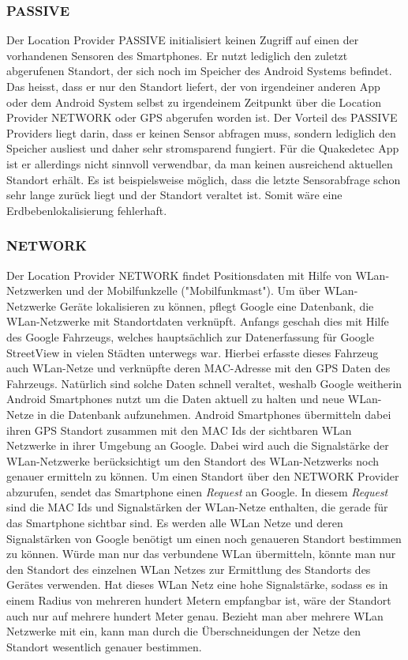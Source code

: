 \subsubsection{PASSIVE}
Der Location Provider PASSIVE initialisiert keinen Zugriff auf einen der vorhandenen Sensoren des Smartphones. Er nutzt lediglich den zuletzt abgerufenen Standort, der sich noch im Speicher des Android Systems befindet. Das heisst, dass er nur den Standort liefert, der von irgendeiner anderen App oder dem Android System selbst zu irgendeinem Zeitpunkt über die Location Provider NETWORK oder GPS abgerufen worden ist. Der Vorteil des PASSIVE Providers liegt darin, dass er keinen Sensor abfragen muss, sondern lediglich den Speicher ausliest und daher sehr stromsparend fungiert. Für die Quakedetec App ist er allerdings nicht sinnvoll verwendbar, da man keinen ausreichend aktuellen Standort erhält. Es ist beispielsweise möglich, dass die letzte Sensorabfrage schon sehr lange zurück liegt und der Standort veraltet ist.
Somit wäre eine Erdbebenlokalisierung fehlerhaft.

\subsubsection{NETWORK}
Der Location Provider NETWORK findet Positionsdaten mit Hilfe von WLan-Netzwerken und der Mobilfunkzelle ("Mobilfunkmast"). 
Um über WLan-Netzwerke Geräte lokalisieren zu können, pflegt Google eine Datenbank, die WLan-Netzwerke mit Standortdaten verknüpft.
Anfangs geschah dies mit Hilfe des Google Fahrzeugs, welches hauptsächlich zur Datenerfassung für Google StreetView in vielen Städten unterwegs war. Hierbei erfasste dieses Fahrzeug auch WLan-Netze und verknüpfte deren MAC-Adresse mit den GPS Daten des Fahrzeugs.
Natürlich sind solche Daten schnell veraltet, weshalb Google weitherin Android Smartphones nutzt um die Daten aktuell zu halten und neue WLan-Netze in die Datenbank aufzunehmen.
Android Smartphones übermitteln dabei ihren GPS Standort zusammen mit den MAC Ids der sichtbaren WLan Netzwerke in ihrer Umgebung an Google. Dabei wird auch die Signalstärke der WLan-Netzwerke berücksichtigt um den Standort des WLan-Netzwerks noch genauer ermitteln zu können.
Um einen Standort über den NETWORK Provider abzurufen, sendet das Smartphone einen \textit{Request} an Google. In diesem \textit{Request} sind die MAC Ids  und Signalstärken der WLan-Netze enthalten, die gerade für das Smartphone sichtbar sind. Es werden alle WLan Netze und deren Signalstärken von Google benötigt um einen noch genaueren Standort bestimmen zu können. Würde man nur das verbundene WLan übermitteln, könnte man nur den Standort des einzelnen WLan Netzes zur Ermittlung des Standorts des Gerätes verwenden. Hat dieses WLan Netz eine hohe Signalstärke, sodass es in einem Radius von mehreren hundert Metern empfangbar ist, wäre der Standort auch nur auf mehrere hundert Meter genau. Bezieht man aber mehrere WLan Netzwerke mit ein, kann man durch die Überschneidungen der Netze den Standort wesentlich genauer bestimmen. 

